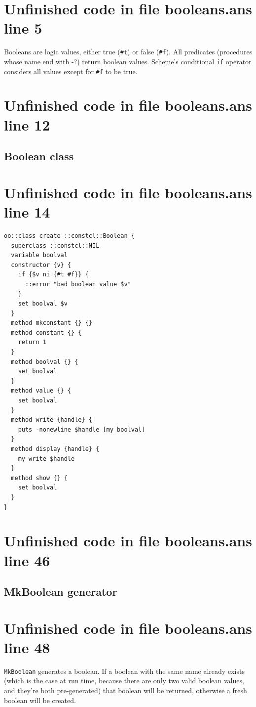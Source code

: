 \documentclass[twoside,9pt]{report}
\begin{document}
\section{Unfinished code in file booleans.ans line 5}


Booleans are logic values, either true (\texttt{\#t}) or false (\texttt{\#f}). All predicates (procedures whose name end with -?) return boolean values. Scheme's conditional \texttt{if} operator considers all values except for \texttt{\#f} to be true.

\section{Unfinished code in file booleans.ans line 12}
\subsection{Boolean class}
\label{boolean-class}
\section{Unfinished code in file booleans.ans line 14}
\begin{lstlisting}
oo::class create ::constcl::Boolean {
  superclass ::constcl::NIL
  variable boolval
  constructor {v} {
    if {$v ni {#t #f}} {
      ::error "bad boolean value $v"
    }
    set boolval $v
  }
  method mkconstant {} {}
  method constant {} {
    return 1
  }
  method boolval {} {
    set boolval
  }
  method value {} {
    set boolval
  }
  method write {handle} {
    puts -nonewline $handle [my boolval]
  }
  method display {handle} {
    my write $handle
  }
  method show {} {
    set boolval
  }
}
\end{lstlisting}
\section{Unfinished code in file booleans.ans line 46}
\subsection{MkBoolean generator}
\label{mkboolean-generator}
\section{Unfinished code in file booleans.ans line 48}


\texttt{MkBoolean} generates a boolean. If a boolean with the same name already exists (which is the case at run time, because there are only two valid boolean values, and they're both pre-generated) that boolean will be returned, otherwise a fresh boolean will be created.
\end{document}
